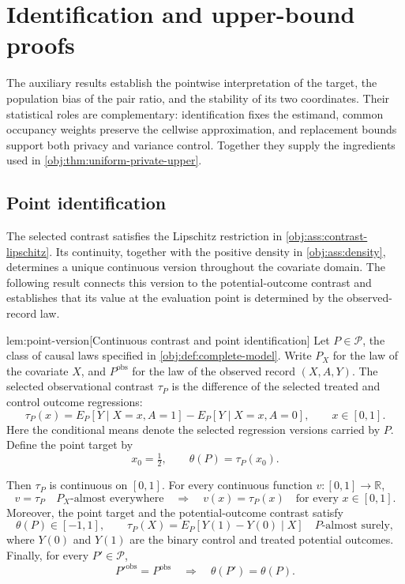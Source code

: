\section{Identification and upper-bound proofs}

The auxiliary results establish the pointwise interpretation of the target, the population bias of the pair ratio, and the stability of its two coordinates. Their statistical roles are complementary: identification fixes the estimand, common occupancy weights preserve the cellwise approximation, and replacement bounds support both privacy and variance control. Together they supply the ingredients used in \cref{obj:thm:uniform-private-upper}.

\subsection{Point identification}

The selected contrast satisfies the Lipschitz restriction in \cref{obj:ass:contrast-lipschitz}. Its continuity, together with the positive density in \cref{obj:ass:density}, determines a unique continuous version throughout the covariate domain. The following result connects this version to the potential-outcome contrast and establishes that its value at the evaluation point is determined by the observed-record law.

\begin{lemmav}{lem:point-version}[Continuous contrast and point identification]
Let \(P\in\mathcal P\), the class of causal laws specified in \cref{obj:def:complete-model}. Write \(P_X\) for the law of the covariate \(X\), and \(P^{\mathrm{obs}}\) for the law of the observed record \((X,A,Y)\). The selected observational contrast \(\tau_P\) is the difference of the selected treated and control outcome regressions:
\[
\tau_P(x)
=
E_P[Y\mid X=x,A=1]
-
E_P[Y\mid X=x,A=0],
\qquad x\in[0,1].
\]
Here the conditional means denote the selected regression versions carried by \(P\). Define the point target by
\[
x_0=\tfrac12,
\qquad
\theta(P)=\tau_P(x_0).
\]

Then \(\tau_P\) is continuous on \([0,1]\). For every continuous function \(v:[0,1]\to\mathbb R\),
\[
v=\tau_P\quad P_X\text{-almost everywhere}
\quad\Longrightarrow\quad
v(x)=\tau_P(x)\quad\text{for every }x\in[0,1].
\]
Moreover, the point target and the potential-outcome contrast satisfy
\[
\theta(P)\in[-1,1],
\qquad
\tau_P(X)=E_P[Y(1)-Y(0)\mid X]
\quad P\text{-almost surely},
\]
where \(Y(0)\) and \(Y(1)\) are the binary control and treated potential outcomes. Finally, for every \(P'\in\mathcal P\),
\[
P'^{\mathrm{obs}}=P^{\mathrm{obs}}
\quad\Longrightarrow\quad
\theta(P')=\theta(P).
\]
\end{lemmav}

